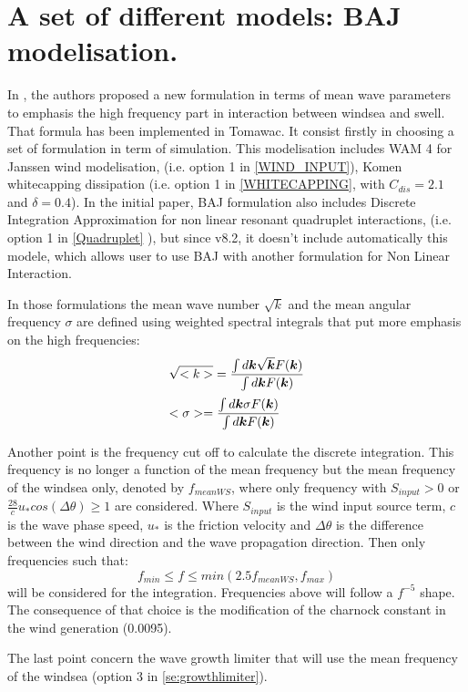 \section{ A set of different models: BAJ modelisation. }
\label{se:baj}
In \cite{Bidlot2007}, the authors proposed a new formulation in terms of mean wave parameters to emphasis the high frequency part in interaction between windsea and swell. That formula has been implemented in Tomawac. It consist firstly in choosing a set of formulation in term of simulation. This modelisation includes WAM 4 for Janssen wind modelisation, (i.e. option 1 in \ref{WIND_INPUT}), Komen whitecapping dissipation (i.e. option 1 in \ref{WHITECAPPING},%
with $C_{dis}=2.1$ and $\delta=0.4$). In the initial paper, BAJ formulation also includes  Discrete Integration Approximation for non linear resonant quadruplet interactions, (i.e. option 1 in \ref{Quadruplet}%
), but since \telemac v8.2, it doesn't include automatically this modele, which allows user to use BAJ with another formulation for Non Linear Interaction.   

 In those formulations the mean wave number $\sqrt{k}$
 and the mean angular frequency $\sigma$ are defined using weighted spectral integrals that put more emphasis on the high frequencies:
$$
\barr{l}
\dsp \sqrt{<k>}=\frac{\int d \vec{k}\sqrt{\vec{k}}F(\vec{k})}{\int d \vec{k}F(\vec{k})} \\[12pt]
\dsp <\sigma>=\frac{\int d \vec{k}\sigma F(\vec{k})}{\int d \vec{k}F(\vec{k})}
\earr
$$

 Another point is the frequency cut off to calculate the discrete integration. This frequency is no longer a function of the mean frequency but the mean frequency of the windsea only, denoted by $f_{meanWS}$, where only frequency with $S_{input}>0$ or $\frac{28}{c}u_*cos(\Delta  \theta) \ge 1$  are considered. Where $S_{input}$ is the wind input source term, $c$ is the wave phase speed, $u_*$ is the friction velocity and $\Delta  \theta$ is the difference between the wind direction and the wave propagation direction. Then only frequencies such that:
$$
f_{min}\le f \le min(2.5 f_{meanWS},f_{max})
$$
 will be considered for the integration. Frequencies above will follow a $f^{-5}$ shape. The consequence of that choice is the modification of the charnock constant in the wind generation (0.0095).

 The last point concern the wave growth limiter that will use the mean frequency of the windsea (option 3 in \ref{se:growthlimiter}). 

